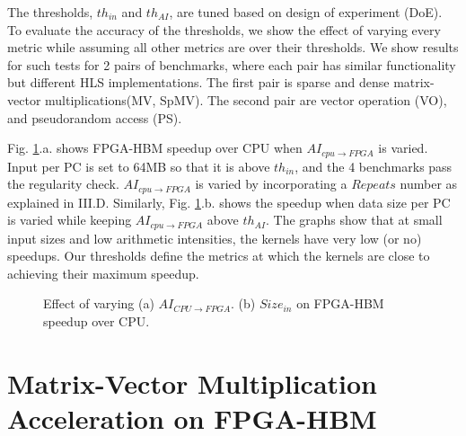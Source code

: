 \documentclass[manuscript,screen,review]{acmart}
\begin{document}
The thresholds, $th_{in}$ and $th_{AI}$, are tuned based on design of experiment (DoE).  
To evaluate the accuracy of the thresholds, we show the effect of varying every metric while assuming all other metrics are over their thresholds. We show results for such tests for 2 pairs of benchmarks, where each pair has similar functionality but different HLS implementations. The first pair is sparse and dense matrix-vector multiplications(MV, SpMV). The second pair are vector operation (VO), and pseudorandom access (PS). 


Fig. \ref{thresholds}.a. shows FPGA-HBM speedup over CPU when $AI_{cpu\rightarrow FPGA}$ is varied. Input per PC is set to 64MB so that it is above $th_{in}$, and the 4 benchmarks pass the regularity check. $AI_{cpu\rightarrow FPGA}$ is varied by incorporating a $Repeats$ number as explained in III.D. Similarly, Fig. \ref{thresholds}.b. shows the speedup when data size per PC is varied while keeping $AI_{cpu\rightarrow FPGA}$ above $th_{AI}$. The graphs show that at small input sizes and low arithmetic intensities, the kernels have very low (or no) speedups. Our thresholds define the metrics at which the kernels are close to achieving their maximum speedup.

\begin{figure}%
	\centering
	\qquad
	\caption{Effect of varying (a) $AI_{CPU\rightarrow FPGA}$. (b) $Size_{in}$ on FPGA-HBM speedup over CPU.}%
	\label{thresholds}%
\end{figure}

\section{Matrix-Vector Multiplication Acceleration on FPGA-HBM}
\end{document}

